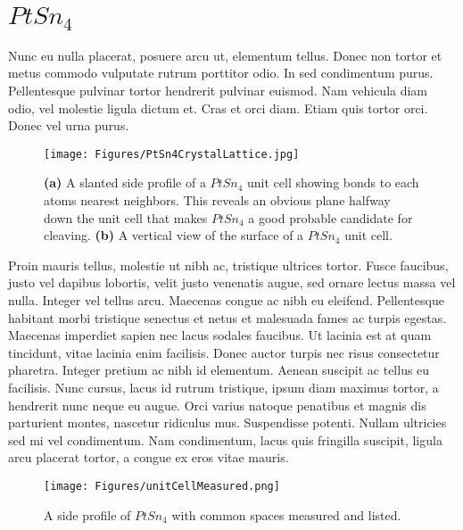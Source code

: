 \section{$PtSn_4$}

Nunc eu nulla placerat, posuere arcu ut, elementum tellus. Donec non tortor et metus commodo vulputate rutrum porttitor odio. In sed condimentum purus. Pellentesque pulvinar tortor hendrerit pulvinar euismod. Nam vehicula diam odio, vel molestie ligula dictum et. Cras et orci diam. Etiam quis tortor orci. Donec vel urna purus.

    \begin{figure}
        \centering
        \texttt{[image: Figures/PtSn4CrystalLattice.jpg]}
        \caption{\textbf{(a)} A slanted side profile of a $PtSn_4$ unit cell showing bonds to 			each atoms nearest neighbors. This reveals an obvious plane halfway down the unit cell 			that makes $PtSn_4$ a good probable candidate for cleaving. \textbf{(b)} A vertical 			view of the surface of a $PtSn_4$ unit cell.}
        \label{fig:PtSn_4CrystalLattice}
    \end{figure}

Proin mauris tellus, molestie ut nibh ac, tristique ultrices tortor. Fusce faucibus, justo vel dapibus lobortis, velit justo venenatis augue, sed ornare lectus massa vel nulla. Integer vel tellus arcu. Maecenas congue ac nibh eu eleifend. Pellentesque habitant morbi tristique senectus et netus et malesuada fames ac turpis egestas. Maecenas imperdiet sapien nec lacus sodales faucibus. Ut lacinia est at quam tincidunt, vitae lacinia enim facilisis. Donec auctor turpis nec risus consectetur pharetra. Integer pretium ac nibh id elementum. Aenean suscipit ac tellus eu facilisis. Nunc cursus, lacus id rutrum tristique, ipsum diam maximus tortor, a hendrerit nunc neque eu augue. Orci varius natoque penatibus et magnis dis parturient montes, nascetur ridiculus mus. Suspendisse potenti. Nullam ultricies sed mi vel condimentum. Nam condimentum, lacus quis fringilla suscipit, ligula arcu placerat tortor, a congue ex eros vitae mauris.

    \begin{figure}
        \centering
        \texttt{[image: Figures/unitCellMeasured.png]}
        \caption{A side profile of $PtSn_4$ with common spaces measured and listed.}
        \label{fig:unitCellMeasured}
    \end{figure}
    
